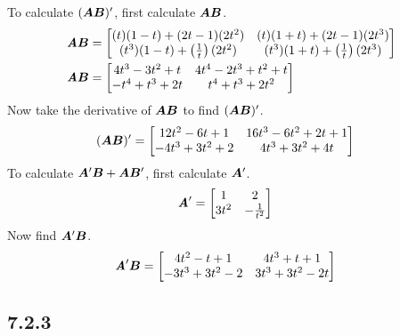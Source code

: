 \documentclass{article}
\begin{document}
To calculate $ (\matr{A}\matr{B})' $, first calculate $ \matr{A}\matr{B} $.
\begin{align*}
	\matr{A}\matr{B} & =
		\begin{bmatrix}
			(t)(1 - t) + (2t - 1)(2t^2) & (t)(1 + t) + (2t - 1)(2t^3) \\
			(t^3)(1 - t) + \left( \frac{1}{t} \right) (2t^2) & (t^3)(1 + t) + \left( \frac{1}{t} \right) (2t^3)
		\end{bmatrix} \\
	\matr{A}\matr{B} & =
		\begin{bmatrix}
			4t^3 - 3t^2 + t & 4t^4 - 2t^3 + t^2 + t \\
			-t^4 + t^3 + 2t & t^4 + t^3 + 2t^2
		\end{bmatrix}
\end{align*}
Now take the derivative of $ \matr{A}\matr{B} $ to find $ (\matr{A}\matr{B})' $.
\begin{align*}
	(\matr{A}\matr{B})' & =
		\begin{bmatrix}
			12t^2 - 6t + 1 & 16t^3 -6t^2 + 2t + 1 \\
			-4t^3 + 3t^2 + 2 & 4t^3 + 3t^2 + 4t
		\end{bmatrix}
\end{align*}
To calculate $ \matr{A}'\matr{B} + \matr{A}\matr{B}' $, first calculate $ \matr{A}' $.
\begin{align*}
	\matr{A}' & =
		\begin{bmatrix}
			1 & 2 \\
			3t^2 & -\frac{1}{t^2}
		\end{bmatrix}
\end{align*}
Now find $ \matr{A}'\matr{B} $.
\begin{align*}
	\matr{A}'\matr{B} & =
		\begin{bmatrix}
			4t^2 - t + 1 & 4t^3 + t + 1 \\
			-3t^3 + 3t^2 - 2 & 3t^3 + 3t^2 - 2t
		\end{bmatrix}
\end{align*}

\subsection{7.2.3}
\end{document}
